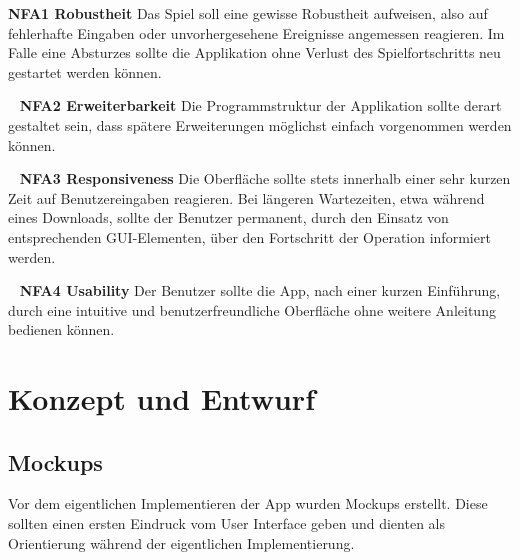 \documentclass{scrartcl}
\begin{document}
\textbf{NFA1 Robustheit} \newline
Das Spiel soll eine gewisse Robustheit aufweisen, also auf fehlerhafte Eingaben
oder unvorhergesehene Ereignisse angemessen reagieren. Im Falle eine Absturzes
sollte die Applikation ohne Verlust des Spielfortschritts neu gestartet werden
können.

\ \newline
\textbf{NFA2 Erweiterbarkeit} \newline
Die Programmstruktur der Applikation sollte derart gestaltet sein, dass
spätere Erweiterungen möglichst einfach vorgenommen werden können.

\ \newline
\textbf{NFA3 Responsiveness} \newline
Die Oberfläche sollte stets innerhalb einer sehr kurzen Zeit auf
Benutzereingaben reagieren. Bei längeren Wartezeiten, etwa während eines
Downloads, sollte der Benutzer permanent, durch den Einsatz von entsprechenden
GUI-Elementen, über den Fortschritt der Operation informiert werden.

\ \newline
\textbf{NFA4 Usability} \newline
Der Benutzer sollte die App, nach einer kurzen Einführung, durch eine intuitive
und benutzerfreundliche Oberfläche ohne weitere Anleitung bedienen können.

\section{Konzept und Entwurf}
\subsection{Mockups}
Vor dem eigentlichen Implementieren der App wurden Mockups erstellt. Diese
sollten einen ersten Eindruck vom User Interface geben und dienten als
Orientierung während der eigentlichen Implementierung.
\end{document}
